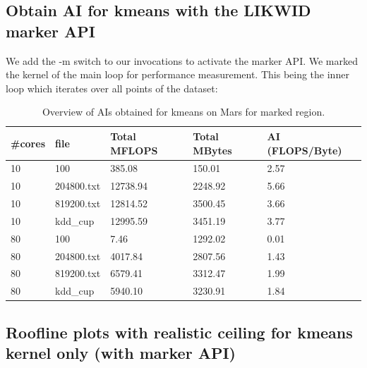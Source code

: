 \subsection{Obtain AI for kmeans with the LIKWID marker API}

We add the -m switch to our invocations to activate the marker API.
We marked the kernel of the main loop for performance measurement.
This being the inner loop which iterates over all points of the dataset:

\begin{table}[h]
\centering
\caption{\label{tab:ai_tab_marked}Overview of AIs obtained for kmeans on Mars for marked region.}
\begin{small}
\begin{tabular}{lllll}
\toprule
\#cores & file & Total MFLOPS & Total MBytes & AI (FLOPS/Byte) \\
\midrule
10 & 100 & 385.08 & 150.01 & 2.57 \\
10 & 204800.txt & 12738.94 & 2248.92 & 5.66 \\
10 & 819200.txt & 12814.52 & 3500.45 & 3.66 \\
10 & kdd\_cup & 12995.59 & 3451.19 & 3.77 \\
80 & 100 & 7.46 & 1292.02 & 0.01 \\
80 & 204800.txt & 4017.84 & 2807.56 & 1.43 \\
80 & 819200.txt & 6579.41 & 3312.47 & 1.99 \\
80 & kdd\_cup & 5940.10 & 3230.91 & 1.84 \\

\bottomrule
\end{tabular}
\end{small}
\end{table}

\subsection{Roofline plots with realistic ceiling for kmeans kernel only (with marker API)}

